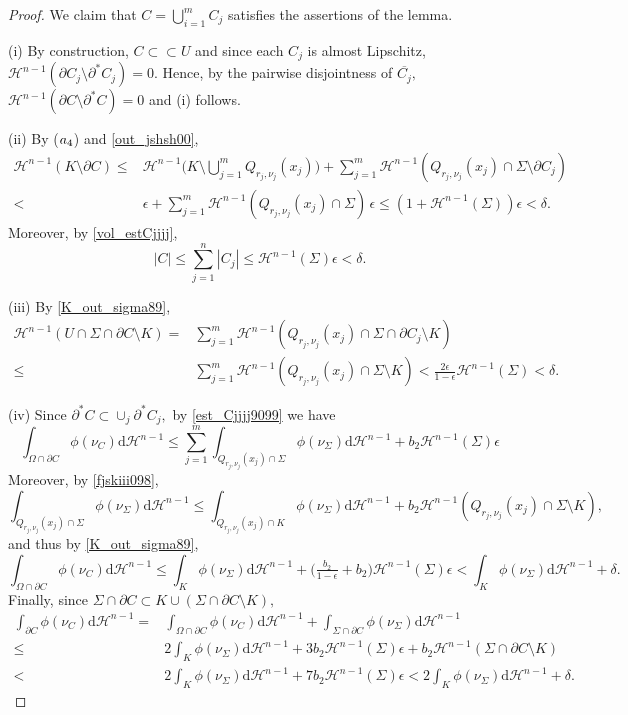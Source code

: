 \documentclass[10pt,a4paper]{amsart}
\newcommand{\bound}{b}
\newcommand{\cH}{\mathcal{H}}
\newcommand{\cl}[1]{\overline{#1}}
\newcommand{\p}{\partial}
\newcommand{\strictlyincluded}{\subset\subset}
\renewcommand{\d}{\mathrm{d}}
\begin{document}
\begin{proof}
We claim that $C= \bigcup_{i=1}^m C_j$ satisfies the assertions of the lemma.

(i) By construction, $C\strictlyincluded U$ and since each $C_j$ is almost Lipschitz, $\cH^{n-1}(\p C_j\setminus \p^*C_j)=0.$ Hence, by the pairwise disjointness of $\cl{C_j},$ $\cH^{n-1}(\p C\setminus \p^*C)=0$ and (i) follows.

(ii) By ($\rm a_4$) and \eqref{out_jshsh00},
\begin{align*}
\cH^{n-1}(K\setminus \p C) \le & \cH^{n-1}\Big(K\setminus \bigcup_{j=1}^m Q_{r_j,\nu_j}(x_j)\Big) + 
\sum\limits_{j=1}^m \cH^{n-1}( Q_{r_j,\nu_j}(x_j)\cap \Sigma  \setminus \p C_j) \\
< & \epsilon +  \sum\limits_{j=1}^m \cH^{n-1}( Q_{r_j,\nu_j}(x_j) \cap\Sigma)\,\epsilon \le
(1+\cH^{n-1}(\Sigma))\epsilon <\delta.
\end{align*}
Moreover, by \eqref{vol_estCjjjj},
$$
|C| \le \sum\limits_{j=1}^n |C_j| \le \cH^{n-1}(\Sigma)\epsilon <\delta.
$$


(iii) By \eqref{K_out_sigma89},
\begin{align*}
\cH^{n-1}( U\cap\Sigma\cap \p C \setminus K) = & \sum\limits_{j=1}^m \cH^{n-1}(Q_{r_j,\nu_j}(x_j)\cap \Sigma\cap \p C_j \setminus K) \\
\le & \sum\limits_{j=1}^m \cH^{n-1}(Q_{r_j,\nu_j}(x_j)\cap \Sigma\setminus K) <\frac{2\epsilon}{1-\epsilon}\cH^{n-1}(\Sigma) <\delta.
\end{align*}

(iv) Since $\p^* C\subset \cup_j \p^* C_j,$ by \eqref{est_Cjjjj9099} we have
$$
\int_{\Omega\cap\p C} \phi(\nu_C)\d\cH^{n-1} 
\le \sum\limits_{j=1}^m \int_{Q_{r_j,\nu_j}(x_j)\cap\Sigma}\phi(\nu_\Sigma)\d\cH^{n-1} + \bound_2\cH^{n-1}(\Sigma)\epsilon
$$
Moreover, by \eqref{fjskiii098},
$$
\int_{Q_{r_j,\nu_j}(x_j)\cap\Sigma}\phi(\nu_\Sigma)\d\cH^{n-1} \le 
\int_{Q_{r_j,\nu_j}(x_j)\cap K} \phi(\nu_\Sigma)\d\cH^{n-1} + \bound_2 \cH^{n-1}(Q_{r_j,\nu_j}(x_j)\cap \Sigma\setminus K),
$$
and thus by \eqref{K_out_sigma89},
$$
\int_{\Omega\cap\p C} \phi(\nu_C)\d\cH^{n-1}  
\le 
\int_K \phi(\nu_\Sigma)\d\cH^{n-1} + \Big(\tfrac{\bound_2}{1-\epsilon} + \bound_2) \cH^{n-1}(\Sigma)\epsilon < \int_K \phi(\nu_\Sigma)\d\cH^{n-1} +\delta.
$$
Finally, since $\Sigma\cap \p C\subset K\cup (\Sigma\cap \p C\setminus K),$  
\begin{align*}
\int_{\p C} \phi(\nu_C)\d\cH^{n-1} = & \int_{\Omega\cap\p C} \phi(\nu_C)\d\cH^{n-1} + \int_{\Sigma\cap \p C} \phi(\nu_\Sigma)\d\cH^{n-1}\\
\le & 2\int_K\phi(\nu_\Sigma)\d\cH^{n-1} + 3\bound_2\cH^{n-1}(\Sigma) \epsilon + 
\bound_2\cH^{n-1}(\Sigma\cap \p C\setminus K)\\
< & 2\int_K\phi(\nu_\Sigma)\d\cH^{n-1} + 7\bound_2\cH^{n-1}(\Sigma) \epsilon 
< 2\int_K \phi(\nu_\Sigma)\d\cH^{n-1} +\delta. 
\end{align*}
\end{proof}
\end{document}
